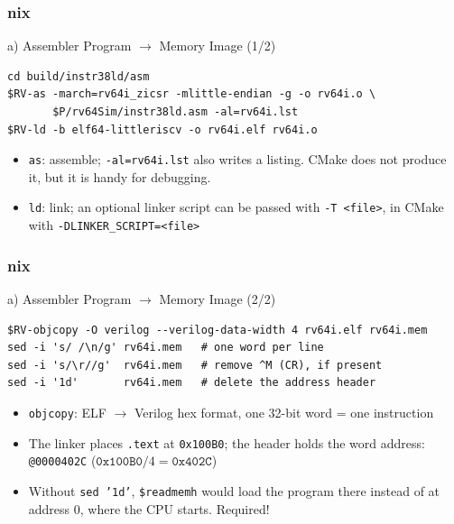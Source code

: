 \documentclass{beamer}
\newcommand{\astitle}{nix}
\newcommand{\assubtitle}{nix}
\newcommand{\cmd}[1]{\texttt{#1}}
\begin{document}
\renewcommand{\assubtitle}{a) Assembler Program $\rightarrow$ Memory Image (1/2)}
\begin{frame}[fragile]
\frametitle{\astitle}
\begin{block}{\assubtitle}
\begin{lstlisting}[style=sh]
cd build/instr38ld/asm
$RV-as -march=rv64i_zicsr -mlittle-endian -g -o rv64i.o \
       $P/rv64Sim/instr38ld.asm -al=rv64i.lst
$RV-ld -b elf64-littleriscv -o rv64i.elf rv64i.o
\end{lstlisting}
  \begin{itemize}
    \item \cmd{as}: assemble; \cmd{-al=rv64i.lst} also writes a listing.
      CMake does not produce it, but it is handy for debugging.
    \item \cmd{ld}: link; an optional linker script can be passed with
      \cmd{-T <file>}, in CMake with \cmd{-DLINKER\_SCRIPT=<file>}
  \end{itemize}
\end{block}
\end{frame}

\renewcommand{\assubtitle}{a) Assembler Program $\rightarrow$ Memory Image (2/2)}
\begin{frame}[fragile]
\frametitle{\astitle}
\begin{block}{\assubtitle}
\begin{lstlisting}[style=sh]
$RV-objcopy -O verilog --verilog-data-width 4 rv64i.elf rv64i.mem
sed -i 's/ /\n/g' rv64i.mem   # one word per line
sed -i 's/\r//g'  rv64i.mem   # remove ^M (CR), if present
sed -i '1d'       rv64i.mem   # delete the address header
\end{lstlisting}
  \small
  \begin{itemize}
    \item \cmd{objcopy}: ELF $\rightarrow$ Verilog hex format,
      one 32-bit word = one instruction
    \item The linker places \cmd{.text} at \cmd{0x100B0}; the header holds the
      word address: \cmd{@0000402C} ($\mathtt{0x100B0} / 4 = \mathtt{0x402C}$)
    \item Without \cmd{sed '1d'}, \cmd{\$readmemh} would load the program there
      instead of at address 0, where the CPU starts. \alert{Required!}
  \end{itemize}
\end{block}
\end{frame}
\end{document}

